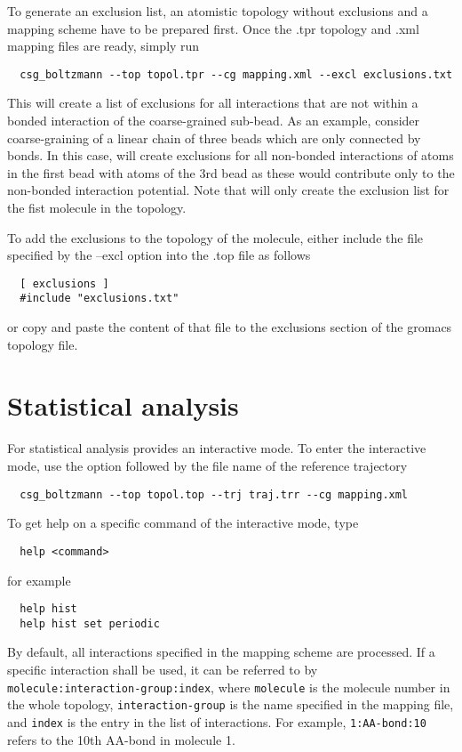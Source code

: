 To generate an exclusion list, an atomistic topology without exclusions and a mapping scheme have to be prepared first. Once the .tpr topology and .xml mapping files are ready, simply run
\begin{verbatim}
  csg_boltzmann --top topol.tpr --cg mapping.xml --excl exclusions.txt
\end{verbatim}
This will create a list of exclusions for all interactions that are not within a bonded interaction of the coarse-grained sub-bead. As an example, consider coarse-graining of a linear chain of three beads  which are only connected by bonds. In this case,  will create exclusions for all non-bonded interactions of atoms in the first bead with atoms of the 3rd bead as these would contribute only to the non-bonded interaction potential. Note that  will only create the exclusion list for the fist molecule in the topology.

To add the exclusions to the \gromacs topology of the molecule, either include the file specified by the --excl option into the .top file as follows
\begin{verbatim}
  [ exclusions ]
  #include "exclusions.txt"
\end{verbatim}
or copy and paste the content of that file to the exclusions section of the gromacs topology file.

\section{Statistical analysis}
For statistical analysis  provides an interactive mode. To enter the interactive mode, use the  option followed by the file name of the reference trajectory 
\begin{verbatim}
  csg_boltzmann --top topol.top --trj traj.trr --cg mapping.xml
\end{verbatim}
%
To get help on a specific command of the interactive mode, type
\begin{verbatim}
  help <command>
\end{verbatim}
for example
\begin{verbatim}
  help hist
  help hist set periodic
\end{verbatim}
%
By default, all interactions specified in the mapping scheme are processed. If a specific interaction shall be used, it can be referred to by \texttt{molecule:interaction-group:index}, where \texttt{molecule} is the molecule number in the whole topology, \texttt{interaction-group} is the name specified in the mapping file, and \texttt{index} is the entry in the list of interactions. For example, \texttt{1:AA-bond:10} refers to the 10th AA-bond in molecule 1. 

